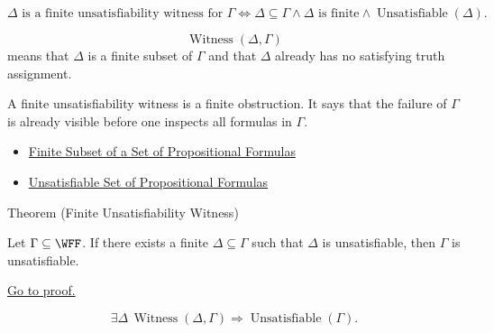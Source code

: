 \begin{remark*}
\[
\Delta\text{ is a finite unsatisfiability witness for }\Gamma
\Longleftrightarrow
\Delta\subseteq\Gamma\land \Delta\text{ is finite}\land
\operatorname{Unsatisfiable}(\Delta).
\]
\end{remark*}

\begin{remark*}
\[
\operatorname{Witness}(\Delta,\Gamma)
\]
means that \(\Delta\) is a finite subset of \(\Gamma\) and that \(\Delta\)
already has no satisfying truth assignment.
\end{remark*}

\begin{remark*}[Interpretation]
A finite unsatisfiability witness is a finite obstruction. It says that the
failure of \(\Gamma\) is already visible before one inspects all formulas in
\(\Gamma\).
\end{remark*}

\begin{dependencies}
\begin{itemize}
  \item \hyperref[def:finite-subset-of-set-of-propositional-formulas]{Finite Subset of a Set of Propositional Formulas}
  \item \hyperref[def:unsatisfiable-set-of-propositional-formulas]{Unsatisfiable Set of Propositional Formulas}
\end{itemize}
\end{dependencies}

\begin{theorembox}{Theorem (Finite Unsatisfiability Witness)}
\begin{theorem}
\label{thm:finite-unsatisfiability-witness-propositional-logic}
Let \(\Gamma\subseteq\WFF\). If there exists a finite
\(\Delta\subseteq\Gamma\) such that \(\Delta\) is unsatisfiable, then
\(\Gamma\) is unsatisfiable.

\medskip
\noindent\hyperref[prf:finite-unsatisfiability-witness-propositional-logic]{Go to proof.}
\end{theorem}
\end{theorembox}

\begin{remark*}
\[
\exists\Delta\,\operatorname{Witness}(\Delta,\Gamma)
\Rightarrow
\operatorname{Unsatisfiable}(\Gamma).
\]
\end{remark*}

